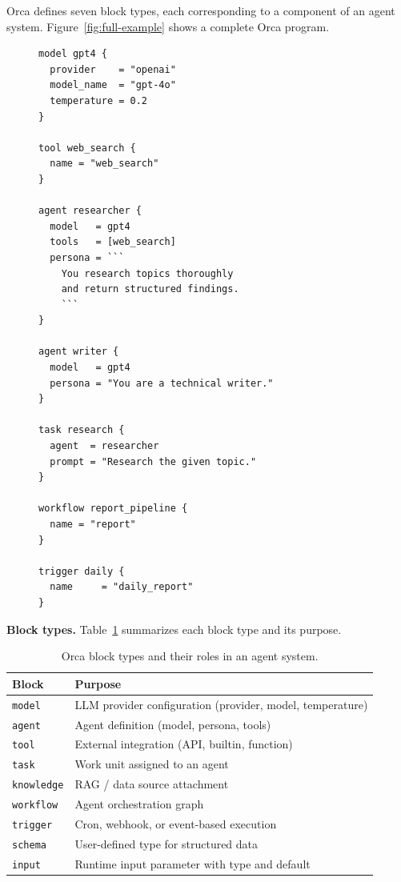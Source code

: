 \documentclass[sigconf,nonacm]{acmart}
\begin{document}
Orca defines seven block types, each corresponding to a component of an
agent system. Figure~\ref{fig:full-example} shows a complete Orca program.

\begin{figure}[t]
\begin{lstlisting}[caption={A complete Orca program defining a multi-agent
  research-and-writing pipeline.},label={fig:full-example}]
model gpt4 {
  provider    = "openai"
  model_name  = "gpt-4o"
  temperature = 0.2
}

tool web_search {
  name = "web_search"
}

agent researcher {
  model   = gpt4
  tools   = [web_search]
  persona = ```
    You research topics thoroughly
    and return structured findings.
    ```
}

agent writer {
  model   = gpt4
  persona = "You are a technical writer."
}

task research {
  agent  = researcher
  prompt = "Research the given topic."
}

workflow report_pipeline {
  name = "report"
}

trigger daily {
  name     = "daily_report"
}
\end{lstlisting}
\end{figure}

\noindent\textbf{Block types.} Table~\ref{tab:blocks} summarizes each
block type and its purpose.

\begin{table}[t]
\caption{Orca block types and their roles in an agent system.}
\label{tab:blocks}
\centering
\small
\begin{tabular}{@{}ll@{}}
\toprule
\textbf{Block} & \textbf{Purpose} \\
\midrule
\texttt{model}     & LLM provider configuration (provider, model, temperature) \\
\texttt{agent}     & Agent definition (model, persona, tools) \\
\texttt{tool}      & External integration (API, builtin, function) \\
\texttt{task}      & Work unit assigned to an agent \\
\texttt{knowledge} & RAG / data source attachment \\
\texttt{workflow}  & Agent orchestration graph \\
\texttt{trigger}   & Cron, webhook, or event-based execution \\
\texttt{schema}    & User-defined type for structured data \\
\texttt{input}     & Runtime input parameter with type and default \\
\bottomrule
\end{tabular}
\end{table}
\end{document}
